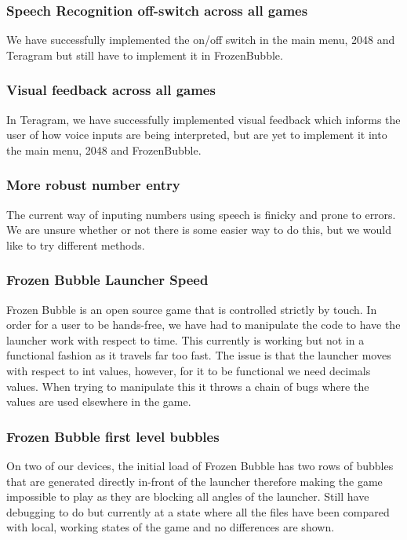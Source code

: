\documentclass[11pt, oneside]{article}
\begin{document}
\subsubsection*{Speech Recognition off-switch across all games}
We have successfully implemented the on/off switch in the main menu, 2048 and 
Teragram but still have to implement it in FrozenBubble.

\subsubsection*{Visual feedback across all games}
In Teragram, we have successfully implemented visual feedback which
informs the user of how voice inputs are being interpreted, but are
yet to implement it into the main menu, 2048 and FrozenBubble.


\subsubsection*{More robust number entry}
The current way of inputing numbers using speech is finicky and prone to
errors. We are unsure whether or not there is some easier way to do this,
but we would like to try different methods.


\subsubsection*{Frozen Bubble Launcher Speed}
Frozen Bubble is an open source game that is controlled strictly by touch. 
In order for a user to be hands-free, we have had to manipulate the code 
to have the launcher work with respect to time. This currently is working
but not in a functional fashion as it travels far too fast. The issue is 
that the launcher moves with respect to int values, however, for it to be 
functional we need decimals values. When trying to manipulate this it 
throws a chain of bugs where the values are used elsewhere in the game. 


\subsubsection*{Frozen Bubble first level bubbles}
On two of our devices, the initial load of Frozen Bubble has two rows of 
bubbles that are generated directly in-front of the launcher therefore making
the game impossible to play as they are blocking all angles of the launcher. 
Still have debugging to do but currently at a state where all the files have 
been compared with local, working states of the game and no differences are
shown.
\end{document}

